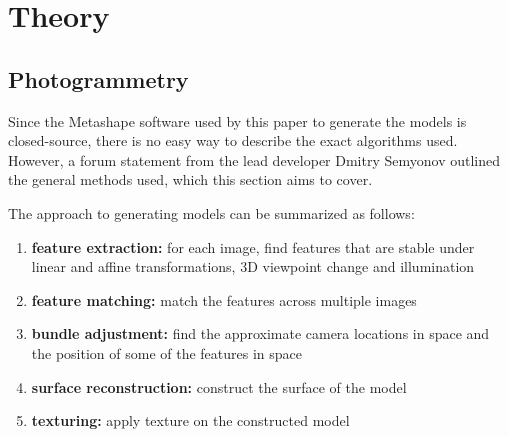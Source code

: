 % 
% 
% 
% 

\chapter{Theory}


\section{Photogrammetry}
Since the Metashape software used by this paper to generate the models is closed-source, there is no easy way to describe the exact algorithms used.
However, a forum statement from the lead developer Dmitry Semyonov \parencite{metashapeForumPost} outlined the general methods used, which this section aims to cover.

The approach to generating models can be summarized as follows:

\begin{enumerate}
	\item \textbf{feature extraction:} for each image, find features that are stable under linear and affine transformations, 3D viewpoint change and illumination
	\item \textbf{feature matching:} match the features across multiple images
	\item \textbf{bundle adjustment:} find the approximate camera locations in space and the position of some of the features in space
	\item \textbf{surface reconstruction:} construct the surface of the model
	\item \textbf{texturing:} apply texture on the constructed model
\end{enumerate}

